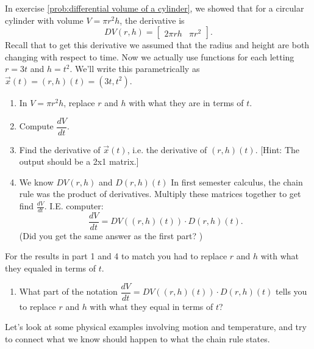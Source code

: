 \begin{problem}\label{chain rule two}
 In exercise \ref{prob:differential volume of a cylinder}, we showed that for a circular cylinder with volume $V=\pi r^2 h$, the derivative is 
$$DV(r,h)=\begin{bmatrix}
2\pi rh & \pi r^2
\end{bmatrix}.$$  
Recall that to get this derivative we assumed that the radius and height are both changing with respect to time. Now we actually use functions for each letting $r=3t$ and $h=t^2$. We'll write this parametrically as $\vec x (t) = (r,h)(t) = (3t, t^2)$.  
\begin{enumerate}
	\item In $V=\pi r^2 h$, replace $r$ and $h$ with what they are in terms of $t$. 
	\item Compute $\dfrac{dV}{dt}$. 
	\item Find the derivative of $\vec x (t) $, i.e. the derivative of $(r,h)(t)$. [Hint: The output should be a 2x1 matrix.] 
	\item We know 
$DV(r,h)$ and
$D(r,h)(t)$
In first semester calculus, the chain rule was the product of derivatives. Multiply these matrices together to get find $\frac{dV}{dt}$. I.E. computer: $$\dfrac{dV}{dt}=DV((r,h)(t))\cdot D(r,h)(t).$$ (Did you get the same answer as the first part? )
\end{enumerate}
For the results in part 1 and 4 to match you had to replace $r$ and $h$ with what they equaled in terms of $t$. 
\begin{enumerate}[resume]
	\item What part of the notation $\dfrac{dV}{dt}=DV((r,h)(t))\cdot D(r,h)(t)$ tells you to replace $r$ and $h$ with what they equal in terms of $t$?
\end{enumerate}
\end{problem}


Let's look at some physical examples involving motion and temperature, and try to connect what we know should happen to what the chain rule states.


